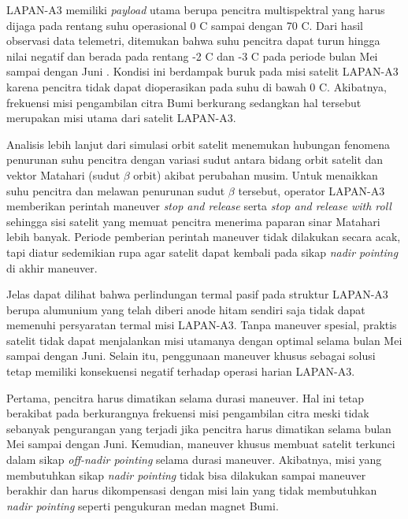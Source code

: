 LAPAN-A3 memiliki \textit{payload} utama berupa pencitra multispektral yang
harus dijaga pada rentang suhu operasional 0 \degree C sampai dengan 70 \degree
C. Dari hasil observasi data telemetri, ditemukan bahwa suhu pencitra dapat
turun hingga nilai negatif dan berada pada rentang -2 \degree C dan -3 \degree
C pada periode bulan Mei sampai dengan Juni \cite{ribah2019}. Kondisi ini
berdampak buruk pada misi satelit LAPAN-A3 karena pencitra tidak dapat
dioperasikan pada suhu di bawah 0 \degree C. Akibatnya, frekuensi misi
pengambilan citra Bumi berkurang sedangkan hal tersebut merupakan misi utama
dari satelit LAPAN-A3.

Analisis lebih lanjut dari simulasi orbit satelit menemukan hubungan fenomena
penurunan suhu pencitra dengan variasi sudut antara bidang orbit satelit dan
vektor Matahari (sudut $\beta$ orbit) akibat perubahan musim. Untuk menaikkan
suhu pencitra dan melawan penurunan sudut $\beta$ tersebut, operator LAPAN-A3
memberikan perintah maneuver \textit{stop and release} serta \textit{stop and
release with roll} sehingga sisi satelit yang memuat pencitra menerima paparan
sinar Matahari lebih banyak. Periode pemberian perintah maneuver tidak
dilakukan secara acak, tapi diatur sedemikian rupa agar satelit dapat kembali
pada sikap \textit{nadir pointing} di akhir maneuver.

Jelas dapat dilihat bahwa perlindungan termal pasif pada struktur LAPAN-A3
berupa alumunium yang telah diberi anode hitam sendiri saja tidak dapat
memenuhi persyaratan termal misi LAPAN-A3. Tanpa maneuver spesial, praktis
satelit tidak dapat menjalankan misi utamanya dengan optimal selama bulan Mei
sampai dengan Juni. Selain itu, penggunaan maneuver khusus sebagai solusi tetap
memiliki konsekuensi negatif terhadap operasi harian LAPAN-A3. 

Pertama, pencitra harus dimatikan selama durasi maneuver. Hal ini tetap
berakibat pada berkurangnya frekuensi misi pengambilan citra meski tidak
sebanyak pengurangan yang terjadi jika pencitra harus dimatikan selama bulan
Mei sampai dengan Juni. Kemudian, maneuver khusus membuat satelit terkunci
dalam sikap \textit{off-nadir pointing} selama durasi maneuver. Akibatnya, misi
yang membutuhkan sikap \textit{nadir pointing} tidak bisa dilakukan sampai
maneuver berakhir dan harus dikompensasi dengan misi lain yang tidak
membutuhkan \textit{nadir pointing} seperti pengukuran medan magnet Bumi.

